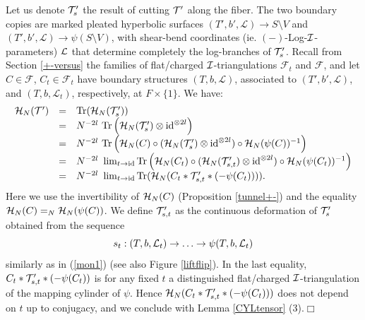 Let us denote ${\mathcal T}_{s}'$ the result of cutting ${\mathcal T}'$ along the
fiber. The two boundary copies are marked pleated hyperbolic surfaces
$(T',b',\mathcal{L}) \rightarrow S\setminus V$ and
$(T',b',\mathcal{L}) \rightarrow \psi(S\setminus V)$, with shear-bend
coordinates (ie. $(-)$-Log-${\mathcal I}$-parameters) ${\mathcal L}$ that determine
completely the log-branches of ${\mathcal T}_s'$. Recall from Section
\ref{+-versus} the families of flat/charged ${\mathcal I}$-triangulations
$\mathcal{F}_t$ and $\mathcal{F}$, and let $C \in \mathcal{F}$, $C_t
\in \mathcal{F}_t$ have boundary structures $(T,b,\mathcal{L})$,
associated to $(T',b',\mathcal{L})$, and $(T,b,\mathcal{L}_t)$,
respectively, at $F\times \{1\}$. We have: $$\begin{array}{lll}
{\mathcal H}_N({\mathcal T}') & = & {\rm Tr}({\mathcal H}_N({\mathcal T}_{s}'))\\ & = & N^{-2l}\ {\rm
Tr}\left( {\mathcal H}_N({\mathcal T}_{s}') \otimes {\rm id}^{\otimes 2l} \right)\\ & =
& N^{-2l}\ {\rm Tr}\left({\mathcal H}_N(C) \circ ({\mathcal H}_N({\mathcal T}_{s}') \otimes {\rm
id}^{\otimes 2l}) \circ {\mathcal H}_N(\psi(C))^{-1}\right)\\ & = & N^{-2l}\
\lim_{t \rightarrow {\rm id}} {\rm Tr}\left({\mathcal H}_N(C_t) \circ
({\mathcal H}_N({\mathcal T}_{s,t}')\otimes {\rm id}^{\otimes 2l})\circ
{\mathcal H}_N(\psi(C_t))^{-1}\right)\\ & = & N^{-2l}\ \lim_{t \rightarrow {\rm
id}} {\rm Tr}({\mathcal H}_N(C_t * {\mathcal T}_{s,t}'*(-\psi(C_t)))).
\end{array}$$
Here we use the invertibility of ${\mathcal H}_N(C)$ (Proposition
\ref{tunnel+-}) and the equality ${\mathcal H}_N(C) =_N {\mathcal H}_N(\psi(C))$. We
define ${\mathcal T}_{s,t}'$ as the continuous deformation of ${\mathcal T}_{s}'$
obtained from the sequence
$$s_t: (T,b,{\mathcal L}_t) \rightarrow \ldots \rightarrow \psi(T,b,{\mathcal L}_t)$$
similarly as in (\ref{mon1}) (see also Figure \ref{liftflip}). In the
last equality, $C_t * {\mathcal T}_{s,t}'*(-\psi(C_t))$ is for any fixed $t$ a
distinguished flat/charged ${\mathcal I}$-triangulation of the mapping cylinder
of $\psi$. Hence ${\mathcal H}_N(C_t * {\mathcal T}_{s,t}'*(-\psi(C_t)))$ does not
depend on $t$ up to conjugacy, and we conclude with Lemma
\ref{CYLtensor} (3).\hfill$\Box$

\medskip

